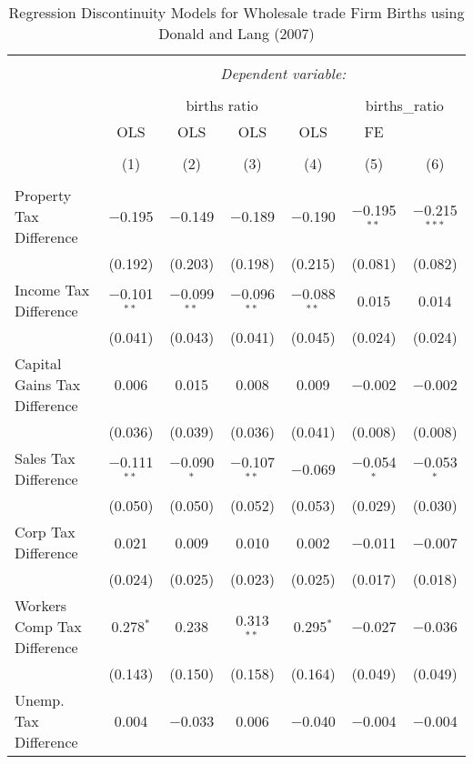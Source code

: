 
\begin{table}[!htbp] \centering 
  \caption{Regression Discontinuity Models for  Wholesale trade Firm Births using Donald and Lang (2007)} 
  \label{} 
\begin{tabular}{@{\extracolsep{5pt}}lcccccc} 
\\[-1.8ex]\hline 
\hline \\[-1.8ex] 
 & \multicolumn{6}{c}{\textit{Dependent variable:}} \\ 
\cline{2-7} 
\\[-1.8ex] & \multicolumn{4}{c}{births ratio} & \multicolumn{2}{c}{births\_ratio} \\ 
 & OLS & OLS & OLS & OLS & FE &  \\ 
\\[-1.8ex] & (1) & (2) & (3) & (4) & (5) & (6)\\ 
\hline \\[-1.8ex] 
 Property Tax Difference & $-$0.195 & $-$0.149 & $-$0.189 & $-$0.190 & $-$0.195$^{**}$ & $-$0.215$^{***}$ \\ 
  & (0.192) & (0.203) & (0.198) & (0.215) & (0.081) & (0.082) \\ 
  Income Tax Difference & $-$0.101$^{**}$ & $-$0.099$^{**}$ & $-$0.096$^{**}$ & $-$0.088$^{**}$ & 0.015 & 0.014 \\ 
  & (0.041) & (0.043) & (0.041) & (0.045) & (0.024) & (0.024) \\ 
  Capital Gains Tax Difference & 0.006 & 0.015 & 0.008 & 0.009 & $-$0.002 & $-$0.002 \\ 
  & (0.036) & (0.039) & (0.036) & (0.041) & (0.008) & (0.008) \\ 
  Sales Tax Difference & $-$0.111$^{**}$ & $-$0.090$^{*}$ & $-$0.107$^{**}$ & $-$0.069 & $-$0.054$^{*}$ & $-$0.053$^{*}$ \\ 
  & (0.050) & (0.050) & (0.052) & (0.053) & (0.029) & (0.030) \\ 
  Corp Tax Difference & 0.021 & 0.009 & 0.010 & 0.002 & $-$0.011 & $-$0.007 \\ 
  & (0.024) & (0.025) & (0.023) & (0.025) & (0.017) & (0.018) \\ 
  Workers Comp Tax Difference & 0.278$^{*}$ & 0.238 & 0.313$^{**}$ & 0.295$^{*}$ & $-$0.027 & $-$0.036 \\ 
  & (0.143) & (0.150) & (0.158) & (0.164) & (0.049) & (0.049) \\ 
  Unemp. Tax Difference & 0.004 & $-$0.033 & 0.006 & $-$0.040 & $-$0.004 & $-$0.004 \\ 

\end{tabular}
\end{table}
